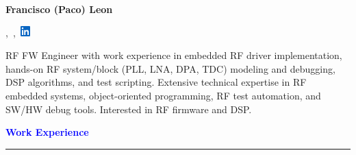 \documentclass[10pt, letterpaper]{letter}
\begin{document}

\vfill

\begin{center}

    \LARGE \textbf{Francisco (Paco) Leon}\\
    \large

    \href{mailto:\myemail}{\myemail},\ \myphone,\
    \href{https://www.linkedin.com/in/francisco-leon-ab8178127/}
    {\includegraphics[width=11pt]{in.png}}\\

\end{center}

\vfill


RF FW Engineer with work experience in embedded RF driver implementation, hands-on RF system/block (PLL, LNA, DPA, TDC) modeling and debugging, DSP algorithms, and test scripting. Extensive technical expertise in RF embedded systems, object-oriented programming, RF test automation, and SW/HW debug tools. Interested in RF firmware and DSP.

\vfill


\textcolor{Blue}{
    \large\textbf{Work Experience}
    \vspace{1pt} %
    \hrule height 1.5pt
}
\end{document}
